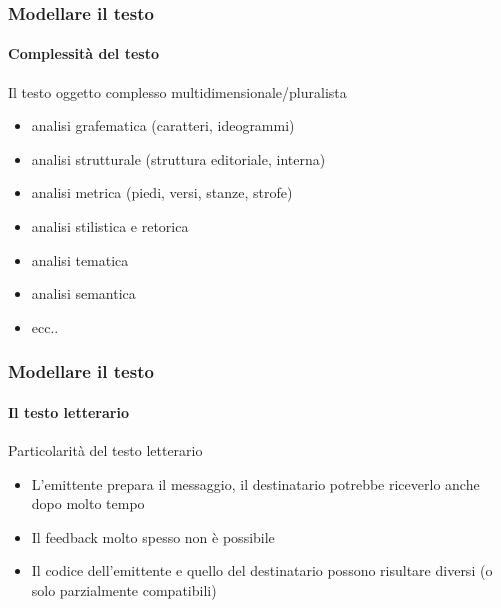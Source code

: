 

\begin{frame}
	\frametitle{Modellare il testo}
	\framesubtitle{Complessità del testo}
	\addtocounter{nframe}{1}

	\begin{block}{Il testo oggetto complesso multidimensionale/pluralista}
		\begin{itemize}
			\item analisi grafematica (caratteri, ideogrammi)
			\item analisi strutturale (struttura editoriale, interna)
			\item analisi metrica (piedi, versi, stanze, strofe)
			\item analisi stilistica e retorica
			\item analisi tematica
			\item analisi semantica
			\item ecc..
		\end{itemize}
	\end{block}

\end{frame}

\begin{frame}
	\frametitle{Modellare il testo}
	\framesubtitle{Il testo letterario}
	\addtocounter{nframe}{1}

	\begin{block}{Particolarità del testo letterario}
		\begin{itemize}
			\item L'emittente prepara il messaggio, il destinatario potrebbe riceverlo anche dopo molto tempo
			\item Il feedback molto spesso non è possibile
			\item Il codice dell'emittente e quello del destinatario possono risultare diversi (o solo parzialmente compatibili)
		\end{itemize}
	\end{block}

\end{frame}


